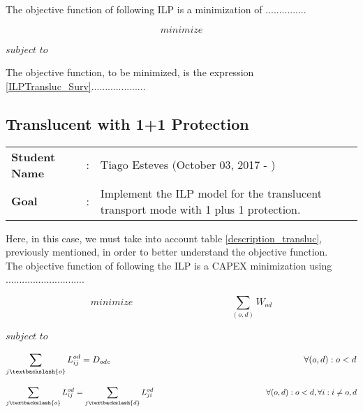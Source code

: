 The objective function of following ILP is a minimization of ...............

\begin{equation}
minimize
\label{ILPTransluc_surv}
\end{equation}

$subject$ $to$


\vspace{10pt}

The objective function, to be minimized, is the expression \ref{ILPTransluc_Surv}....................

\newpage
\subsection{Translucent with 1+1 Protection}\label{ILP_Transluc_Protection}
\begin{tcolorbox}	
\begin{tabular}{p{2.75cm} p{0.2cm} p{10.5cm}} 	
\textbf{Student Name}  &:& Tiago Esteves    (October 03, 2017 - )\\
\textbf{Goal}          &:& Implement the ILP model for the translucent transport mode with 1 plus 1 protection.
\end{tabular}
\end{tcolorbox}
\vspace{11pt}

Here, in this case, we must take into account table \ref{description_transluc}, previously mentioned, in order to better understand the objective function.\\

The objective function of following the ILP is a CAPEX minimization using .............................


\begin{equation}
minimize \qquad \qquad \qquad \qquad \qquad  \sum_{(o,d)} W_{od}
\label{ILPTransluc}
\end{equation}

$subject$ $to$

\begin{equation}
\sum_{j \textbackslash \{o\} } L_{ij}^{od} = D_{odc}
\qquad \qquad \qquad \qquad \qquad \qquad \qquad \qquad \qquad \qquad \qquad
\forall (o,d):o<d
\label{ILPTransluc1}
\end{equation}

\begin{equation}
\sum_{j \textbackslash \{o\} } L_{ij}^{od} = \sum_{j \textbackslash \{d\} } L_{ji}^{od}
\qquad \qquad \qquad \qquad \qquad \qquad \qquad
\forall (o,d):o<d , \forall i : i \neq o,d
\label{ILPTransluc2}
\end{equation}

